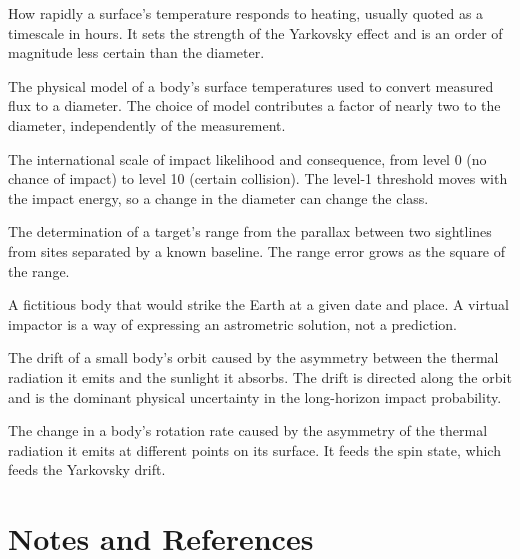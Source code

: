 \begin{description}[style=nextline,leftmargin=1.1em,labelindent=0pt,
  font=\normalfont\ttfamily\color{accent},itemsep=3pt,parsep=0pt]
\item[Thermal inertia] How rapidly a surface's temperature responds to
heating, usually quoted as a timescale in hours. It sets the strength of the
Yarkovsky effect and is an order of magnitude less certain than the
diameter.

\item[Thermal model] The physical model of a body's surface temperatures
used to convert measured flux to a diameter. The choice of model contributes
a factor of nearly two to the diameter, independently of the measurement.

\item[Torino scale] The international scale of impact likelihood and
consequence, from level 0 (no chance of impact) to level 10 (certain
collision). The level-1 threshold moves with the impact energy, so a change
in the diameter can change the class.

\item[Two-station ranging] The determination of a target's range from the
parallax between two sightlines from sites separated by a known baseline.
The range error grows as the square of the range.

\item[Virtual impactor] A fictitious body that would strike the Earth at a
given date and place. A virtual impactor is a way of expressing an
astrometric solution, not a prediction.

\item[Yarkovsky effect] The drift of a small body's orbit caused by the
asymmetry between the thermal radiation it emits and the sunlight it
absorbs. The drift is directed along the orbit and is the dominant physical
uncertainty in the long-horizon impact probability.

\item[YORP effect] The change in a body's rotation rate caused by the
asymmetry of the thermal radiation it emits at different points on its
surface. It feeds the spin state, which feeds the Yarkovsky drift.

\end{description}
\clearpage

\chapter*{Notes and References}
\thispagestyle{plain}


